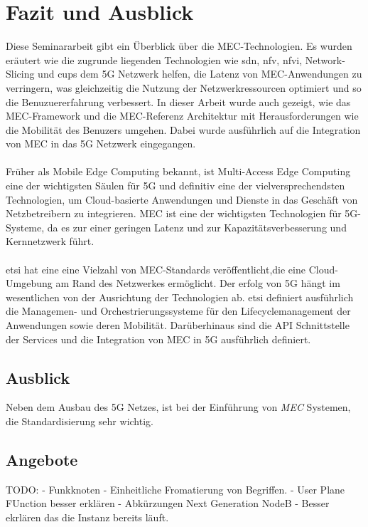 \documentclass[runningheads]{llncs}
\numberwithin{figure}{section}
\begin{document}
\newpage

\section{Fazit und Ausblick}
Diese Seminararbeit gibt ein Überblick über die MEC-Technologien. Es wurden eräutert wie die 
zugrunde liegenden
Technologien wie \acrshort{sdn}, \acrshort{nfv}, \acrshort{nfvi}, Network-Slicing und \acrshort{cups}
dem 5G Netzwerk helfen, die Latenz von MEC-Anwendungen zu verringern, was gleichzeitig die Nutzung der
Netzwerkressourcen optimiert und so die Benuzuererfahrung verbessert. In dieser Arbeit wurde auch gezeigt, 
wie das MEC-Framework und die MEC-Referenz Architektur mit Herausforderungen wie die Mobilität des Benuzers
umgehen. Dabei wurde ausführlich auf die Integration von MEC in das 5G Netzwerk eingegangen.
\\
\\
Früher als Mobile Edge Computing bekannt, ist Multi-Access Edge Computing eine der 
wichtigsten Säulen für 5G und  definitiv eine der vielversprechendsten Technologien, 
um Cloud-basierte Anwendungen und Dienste in das Geschäft von Netzbetreibern zu integrieren.
MEC ist eine der wichtigsten Technologien für 5G-Systeme, 
da es zur einer geringen Latenz und zur Kapazitätsverbesserung und Kernnetzwerk führt. 
\\
\\
\acrlong{etsi} hat eine eine Vielzahl von MEC-Standards veröffentlicht,die eine Cloud-Umgebung am Rand des 
Netzwerkes ermöglicht. Der erfolg von 5G hängt im wesentlichen von der Ausrichtung der Technologien ab.
\acrshort{etsi} definiert ausführlich die Managemen- und Orchestrierungssysteme für den Lifecyclemanagement der 
Anwendungen sowie deren Mobilität. Darüberhinaus sind die API Schnittstelle der Services und die Integration
von MEC in 5G ausführlich definiert. 

\subsection{Ausblick}
Neben dem Ausbau des 5G Netzes, ist bei der Einführung von \textit{MEC} Systemen, 
die Standardisierung sehr wichtig.  \cite{abdullahSegmentRoutingSoftware21}
\subsection{Angebote}
\label{subsec:Angebote}
\label{sec:Ausblick}


\newpage
%
\printbibliography[heading=bibintoc]
TODO: 
- Funkknoten
- Einheitliche Fromatierung von Begriffen.
- User Plane FUnction besser erklären
- Abkürzungen Next Generation NodeB 
- Besser ekrlären das die Instanz bereits läuft.
\end{document}
